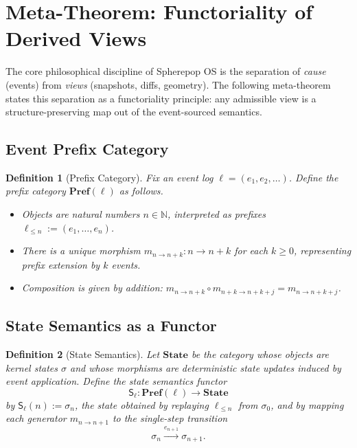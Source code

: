 \documentclass[11pt]{article}
\newtheorem{definition}{Definition}[section]
\begin{document}
\section{Meta-Theorem: Functoriality of Derived Views}

The core philosophical discipline of Spherepop OS is the separation of \emph{cause} (events) from \emph{views} (snapshots, diffs, geometry). The following meta-theorem states this separation as a functoriality principle: any admissible view is a structure-preserving map out of the event-sourced semantics.

\subsection{Event Prefix Category}

\begin{definition}[Prefix Category]
Fix an event log $\ell = (e_1,e_2,\ldots)$. Define the \emph{prefix category} $\mathbf{Pref}(\ell)$ as follows.
\begin{itemize}
\item Objects are natural numbers $n \in \mathbb{N}$, interpreted as prefixes $\ell_{\le n} := (e_1,\ldots,e_n)$.
\item There is a unique morphism $m_{n\to n+k}: n \to n+k$ for each $k\ge 0$, representing prefix extension by $k$ events.
\item Composition is given by addition: $m_{n\to n+k}\circ m_{n+k\to n+k+j}= m_{n\to n+k+j}$.
\end{itemize}
\end{definition}

\subsection{State Semantics as a Functor}

\begin{definition}[State Semantics]
Let $\mathbf{State}$ be the category whose objects are kernel states $\sigma$ and whose morphisms are deterministic state updates induced by event application.
Define the \emph{state semantics functor}
\[
\mathsf{S}_\ell : \mathbf{Pref}(\ell) \to \mathbf{State}
\]
by $\mathsf{S}_\ell(n) := \sigma_n$, the state obtained by replaying $\ell_{\le n}$ from $\sigma_0$, and by mapping each generator $m_{n\to n+1}$ to the single-step transition
\[
\sigma_n \xrightarrow{e_{n+1}} \sigma_{n+1}.
\]
\end{definition}
\end{document}
